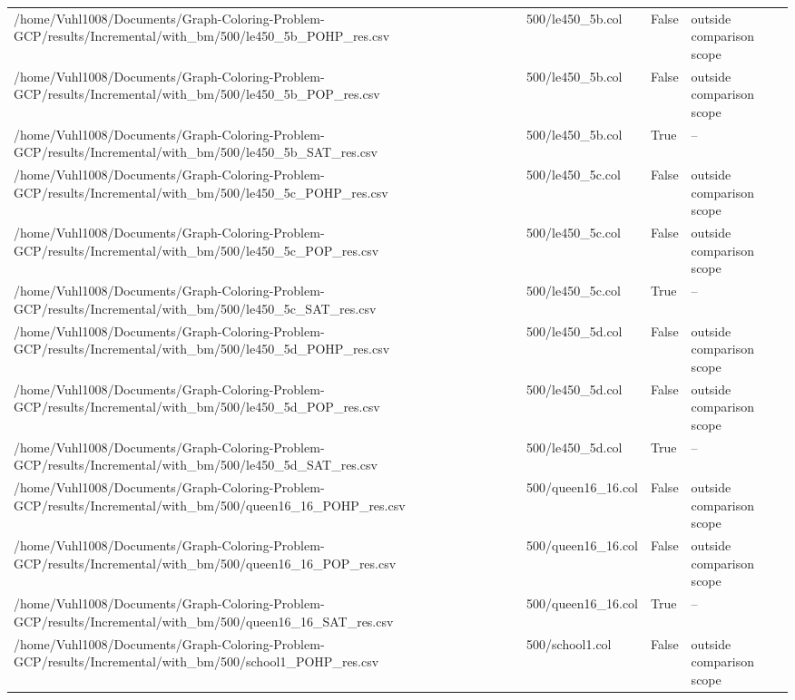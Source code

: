 \begin{table}[htbp]
\begin{tabular}{llll}
/home/Vuhl1008/Documents/Graph-Coloring-Problem-GCP/results/Incremental/with\_bm/500/le450\_5b\_POHP\_res.csv & 500/le450\_5b.col & False & outside comparison scope \\
/home/Vuhl1008/Documents/Graph-Coloring-Problem-GCP/results/Incremental/with\_bm/500/le450\_5b\_POP\_res.csv & 500/le450\_5b.col & False & outside comparison scope \\
/home/Vuhl1008/Documents/Graph-Coloring-Problem-GCP/results/Incremental/with\_bm/500/le450\_5b\_SAT\_res.csv & 500/le450\_5b.col & True & -- \\
/home/Vuhl1008/Documents/Graph-Coloring-Problem-GCP/results/Incremental/with\_bm/500/le450\_5c\_POHP\_res.csv & 500/le450\_5c.col & False & outside comparison scope \\
/home/Vuhl1008/Documents/Graph-Coloring-Problem-GCP/results/Incremental/with\_bm/500/le450\_5c\_POP\_res.csv & 500/le450\_5c.col & False & outside comparison scope \\
/home/Vuhl1008/Documents/Graph-Coloring-Problem-GCP/results/Incremental/with\_bm/500/le450\_5c\_SAT\_res.csv & 500/le450\_5c.col & True & -- \\
/home/Vuhl1008/Documents/Graph-Coloring-Problem-GCP/results/Incremental/with\_bm/500/le450\_5d\_POHP\_res.csv & 500/le450\_5d.col & False & outside comparison scope \\
/home/Vuhl1008/Documents/Graph-Coloring-Problem-GCP/results/Incremental/with\_bm/500/le450\_5d\_POP\_res.csv & 500/le450\_5d.col & False & outside comparison scope \\
/home/Vuhl1008/Documents/Graph-Coloring-Problem-GCP/results/Incremental/with\_bm/500/le450\_5d\_SAT\_res.csv & 500/le450\_5d.col & True & -- \\
/home/Vuhl1008/Documents/Graph-Coloring-Problem-GCP/results/Incremental/with\_bm/500/queen16\_16\_POHP\_res.csv & 500/queen16\_16.col & False & outside comparison scope \\
/home/Vuhl1008/Documents/Graph-Coloring-Problem-GCP/results/Incremental/with\_bm/500/queen16\_16\_POP\_res.csv & 500/queen16\_16.col & False & outside comparison scope \\
/home/Vuhl1008/Documents/Graph-Coloring-Problem-GCP/results/Incremental/with\_bm/500/queen16\_16\_SAT\_res.csv & 500/queen16\_16.col & True & -- \\
/home/Vuhl1008/Documents/Graph-Coloring-Problem-GCP/results/Incremental/with\_bm/500/school1\_POHP\_res.csv & 500/school1.col & False & outside comparison scope \\

\end{tabular}
\end{table}
